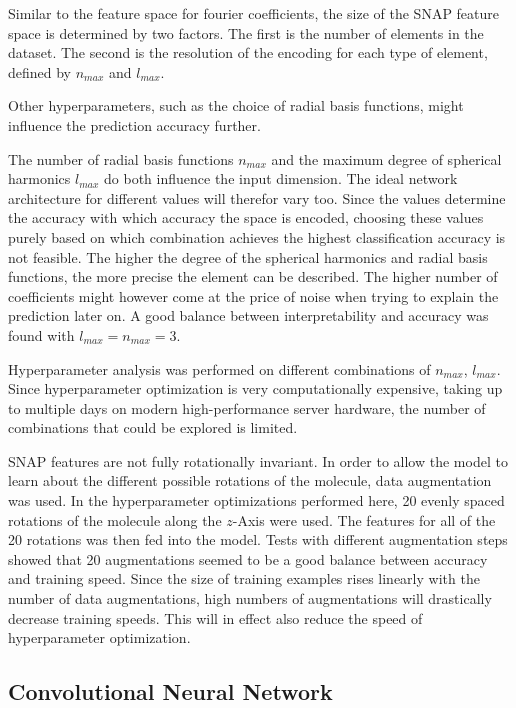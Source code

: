 Similar to the feature space for fourier coefficients, the size of the SNAP feature space is determined by two factors.
The first is the number of elements in the dataset.
The second is the resolution of the encoding for each type of element, defined by $n_{max}$ and $l_{max}$.

Other hyperparameters, such as the choice of radial basis functions, might influence the prediction accuracy further.

The number of radial basis functions $n_{max}$ and the maximum degree of spherical harmonics $l_{max}$ do both influence
the input dimension.
The ideal network architecture for different values will therefor vary too.
Since the values determine the accuracy with which accuracy the space is encoded, choosing these values purely 
based on which combination achieves the highest classification accuracy is not feasible.
The higher the degree of the spherical harmonics and radial basis functions, the more precise the element can be described.
The higher number of coefficients might however come at the price of noise when trying to explain the prediction later on.
A good balance between interpretability and accuracy was found with $l_{max}=n_{max}=3$. %

Hyperparameter analysis was performed on different combinations of $n_{max}$, $l_{max}$.
Since hyperparameter optimization is very computationally expensive, taking up to multiple days on modern high-performance 
server hardware, the number of combinations that could be explored is limited.

SNAP features are not fully rotationally invariant.
In order to allow the model to learn about the different possible rotations of the molecule, data augmentation was used.
In the hyperparameter optimizations performed here, 20 evenly spaced rotations of the molecule along the $z$-Axis were used.
The features for all of the 20 rotations was then fed into the model.
Tests with different augmentation steps showed that 20 augmentations seemed to be a good balance between 
accuracy and training speed.
Since the size of training examples rises linearly with the number of data augmentations,
high numbers of augmentations will drastically decrease training speeds.
This will in effect also reduce the speed of hyperparameter optimization.

\subsection{Convolutional Neural Network}

